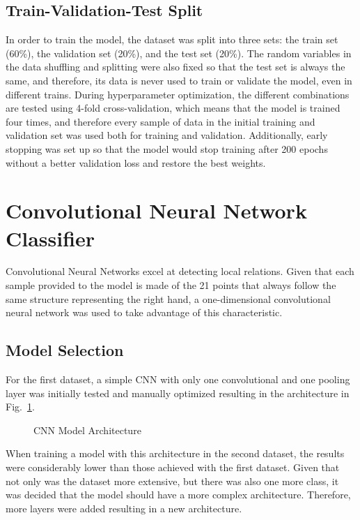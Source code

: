 \subsection{Train-Validation-Test Split}

In order to train the model, the dataset was split into three sets: the train set (60\%), the validation set (20\%), and the test set (20\%). The random variables in the data shuffling and splitting were also fixed so that the test set is always the same, and therefore, its data is never used to train or validate the model, even in different trains. During hyperparameter optimization, the different combinations are tested using 4-fold cross-validation, which means that the model is trained four times, and therefore every sample of data in the initial training and validation set was used both for training and validation. Additionally, early stopping was set up so that the model would stop training after 200 epochs without a better validation loss and restore the best weights.

\section{Convolutional Neural Network Classifier}

Convolutional Neural Networks excel at detecting local relations. Given that each sample provided to the model is made of the 21 points that always follow the same structure representing the right hand, a one-dimensional convolutional neural network was used to take advantage of this characteristic.

\subsection{Model Selection}

For the first dataset, a simple CNN with only one convolutional and one pooling layer was initially tested and manually optimized resulting in the architecture in Fig.~\ref{fig:cnn_architecture_dataset1}.

\begin{figure}[H]
    \centering
    {\fontsize{10}{12}\selectfont}
    \caption[CNN Model Architecture]{CNN Model Architecture}
    \label{fig:cnn_architecture_dataset1}
\end{figure}

When training a model with this architecture in the second dataset, the results were considerably lower than those achieved with the first dataset. Given that not only was the dataset more extensive, but there was also one more class, it was decided that the model should have a more complex architecture. Therefore, more layers were added resulting in a new architecture.

